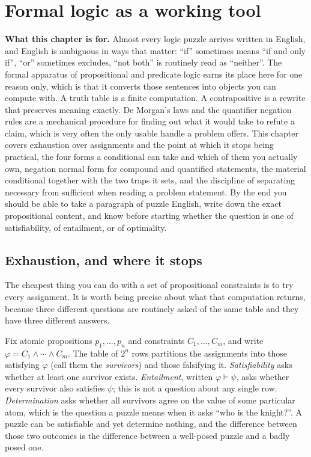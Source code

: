 \chapter{Formal logic as a working tool}

\begin{orient}
\textbf{What this chapter is for.} Almost every logic puzzle arrives written in English, and English is ambiguous in ways that matter: ``if'' sometimes means ``if and only if'', ``or'' sometimes excludes, ``not both'' is routinely read as ``neither''. The formal apparatus of propositional and predicate logic earns its place here for one reason only, which is that it converts those sentences into objects you can compute with. A truth table is a finite computation. A contrapositive is a rewrite that preserves meaning exactly. De Morgan's laws and the quantifier negation rules are a mechanical procedure for finding out what it would take to refute a claim, which is very often the only usable handle a problem offers. This chapter covers exhaustion over assignments and the point at which it stops being practical, the four forms a conditional can take and which of them you actually own, negation normal form for compound and quantified statements, the material conditional together with the two traps it sets, and the discipline of separating necessary from sufficient when reading a problem statement. By the end you should be able to take a paragraph of puzzle English, write down the exact propositional content, and know before starting whether the question is one of satisfiability, of entailment, or of optimality.
\end{orient}

\section{Exhaustion, and where it stops}

The cheapest thing you can do with a set of propositional constraints is to try every assignment. It is worth being precise about what that computation returns, because three different questions are routinely asked of the same table and they have three different answers.

Fix atomic propositions $p_1,\ldots,p_n$ and constraints $C_1,\ldots,C_m$, and write $\varphi=C_1\wedge\cdots\wedge C_m$. The table of $2^n$ rows partitions the assignments into those satisfying $\varphi$ (call them the \emph{survivors}) and those falsifying it. \emph{Satisfiability} asks whether at least one survivor exists. \emph{Entailment}, written $\varphi\models\psi$, asks whether every survivor also satisfies $\psi$; this is not a question about any single row. \emph{Determination} asks whether all survivors agree on the value of some particular atom, which is the question a puzzle means when it asks ``who is the knight?''. A puzzle can be satisfiable and yet determine nothing, and the difference between those two outcomes is the difference between a well-posed puzzle and a badly posed one.


